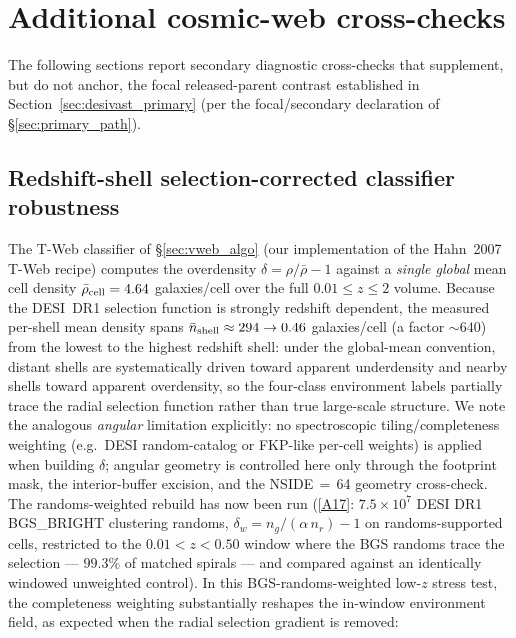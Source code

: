 \documentclass[aps,prd,twocolumn,superscriptaddress,showpacs,preprintnumbers,nofootinbib,longbibliography,floatfix]{revtex4-2}
\newcommand{\repoBase}{https://github.com/Hubify-Projects/bigbounce/blob/main}
\begin{document}
\section{Additional cosmic-web cross-checks}\label{sec:additional_cw}

The following sections report secondary diagnostic cross-checks
that supplement, but do not anchor, the focal released-parent
contrast established in
Section~\ref{sec:desivast_primary} (per the focal/secondary
declaration of \S\ref{sec:primary_path}).

\subsection{Redshift-shell selection-corrected classifier
robustness}\label{sec:zshell_robustness}

The T-Web classifier of \S\ref{sec:vweb_algo} (our implementation of
the Hahn~2007 T-Web recipe) computes the overdensity
$\delta = \rho/\bar\rho - 1$ against a \emph{single global} mean cell
density $\bar\rho_{\rm cell} = 4.64$ galaxies/cell over the full
$0.01 \le z \le 2$ volume. Because the DESI~DR1 selection function is
strongly redshift dependent, the measured per-shell mean density spans
$\bar n_{\rm shell} \approx 294 \to 0.46$ galaxies/cell (a factor
${\sim}640$) from the lowest to the highest redshift shell: under the
global-mean convention, distant shells are systematically driven toward
apparent underdensity and nearby shells toward apparent overdensity, so
the four-class environment labels partially trace the radial selection
function rather than true large-scale structure. We note the analogous
\emph{angular} limitation explicitly: no spectroscopic
tiling/completeness weighting (e.g.\ DESI random-catalog or FKP-like
per-cell weights) is applied when building $\delta$; angular geometry
is controlled here only through the footprint mask, the interior-buffer
excision, and the NSIDE$\,=\,$64 geometry cross-check. The
randoms-weighted rebuild has now been run
(\href{\repoBase/pipelines/p5\_desi\_chirality/outputs/25\_completeness\_weighted\_rebuild.json}{[A17]}:
$7.5\times 10^7$ DESI DR1 BGS\_BRIGHT clustering randoms,
$\delta_w = n_g/(\alpha\,n_r) - 1$ on randoms-supported cells, restricted
to the $0.01 < z < 0.50$ window where the BGS randoms trace the
selection --- $99.3\%$ of matched spirals --- and compared against an
identically windowed unweighted control). In this BGS-randoms-weighted low-$z$ stress test, the completeness weighting substantially reshapes the in-window environment field, as expected when the radial selection gradient is removed:
\end{document}
